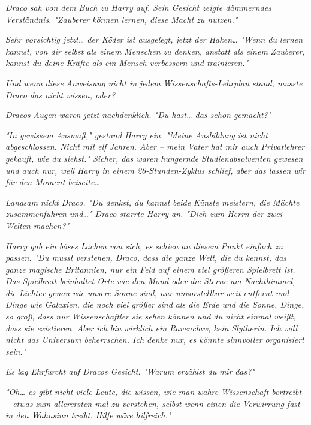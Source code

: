 {\emph{Draco sah von dem Buch zu Harry auf. Sein Gesicht zeigte dämmerndes Verständnis. "Zauberer können lernen, diese Macht zu nutzen."}

\emph{Sehr vorsichtig jetzt… der Köder ist ausgelegt, jetzt der Haken… "Wenn du lernen kannst, von dir selbst als einem} \emph{\emph{Menschen}} \emph{zu denken, anstatt als einem} \emph{\emph{Zauberer,}} \emph{kannst du deine Kräfte als ein Mensch verbessern und trainieren."}

\emph{Und wenn} \emph{\emph{diese}} \emph{Anweisung nicht in} \emph{\emph{jedem}} \emph{Wissenschafts-Lehrplan stand, musste Draco das nicht wissen, oder?}

\emph{Dracos Augen waren jetzt nachdenklich. "Du hast… das schon gemacht?"}

\emph{"In gewissem Ausmaß," gestand Harry ein. "Meine Ausbildung ist nicht abgeschlossen. Nicht mit elf Jahren. Aber -- mein Vater hat mir auch Privatlehrer gekauft, wie du siehst." Sicher, das waren hungernde Studienabsolventen gewesen und auch nur, weil Harry in einem 26-Stunden-Zyklus schlief, aber das lassen wir für den Moment beiseite…}

\emph{Langsam nickt Draco. "Du denkst, du kannst} \emph{\emph{beide}} \emph{Künste meistern, die Mächte zusammenführen und…" Draco starrte Harry an. "Dich zum Herrn der zwei Welten machen?"}

\emph{Harry gab ein böses Lachen von sich, es schien an diesem Punkt einfach zu passen. "Du musst verstehen, Draco, dass die ganze Welt, die du kennst, das ganze magische Britannien, nur ein Feld auf einem viel größeren Spielbrett ist. Das Spielbrett beinhaltet Orte wie den Mond oder die Sterne am Nachthimmel, die Lichter genau wie unsere Sonne sind, nur unvorstellbar weit entfernt und Dinge wie Galaxien, die noch viel größer} \emph{sind als die Erde und die Sonne, Dinge, so groß, dass nur Wissenschaftler sie sehen können und du nicht einmal weißt, dass sie existieren. Aber ich} \emph{\emph{bin}} \emph{wirklich ein Ravenclaw, kein Slytherin. Ich will nicht das Universum beherrschen. Ich denke nur, es könnte sinnvoller organisiert sein."}

\emph{Es lag Ehrfurcht auf Dracos Gesicht. "Warum erzählst du} \emph{\emph{mir}} \emph{das?"}

\emph{"Oh… es gibt nicht viele Leute, die wissen, wie man} \emph{\emph{wahre}} \emph{Wissenschaft bertreibt -- etwas zum allerersten mal zu verstehen, selbst wenn einen die Verwirrung fast in den Wahnsinn treibt. Hilfe wäre hilfreich."}

}
